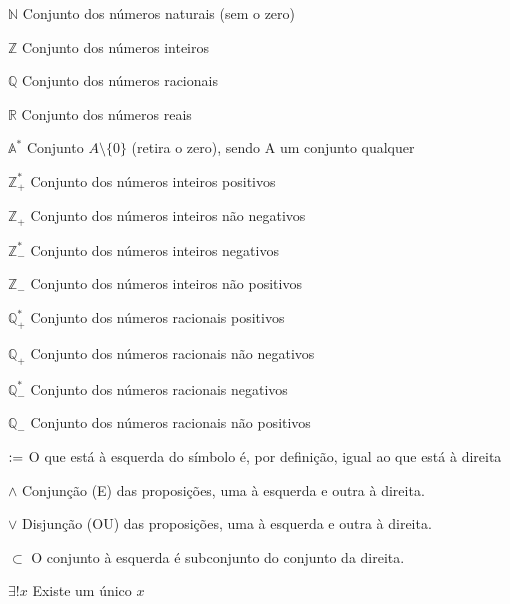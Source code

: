 \documentclass[../main.tex]{subfiles}
\begin{document}


\renewcommand\listadesimbolosname{{\fontsize{12pt}{\baselineskip}\normalfont \bfseries LISTA DE SÍMBOLOS}}
\begin{simbolos}
  \item[$ \mathbb{N} $] Conjunto dos números naturais (sem o zero)
  \item[$ \mathbb{Z} $] Conjunto dos números inteiros 
  \item[$ \mathbb{Q} $] Conjunto dos números racionais 
  \item[$ \mathbb{R} $] Conjunto dos números reais
  \item[$\mathbb{A^*}$] Conjunto $A \setminus \{0\}$ (retira o zero), sendo A um conjunto qualquer
  \item[$ \mathbb{Z}_+^{*} $] Conjunto dos números inteiros positivos
  \item[$ \mathbb{Z}_+$] Conjunto dos números inteiros não negativos
  \item[$ \mathbb{Z}_-^{*} $] Conjunto dos números inteiros negativos
  \item[$ \mathbb{Z}_-$] Conjunto dos números inteiros não positivos
  \item[$ \mathbb{Q}_+^{*} $] Conjunto dos números racionais positivos
  \item[$ \mathbb{Q}_+$] Conjunto dos números racionais não negativos
  \item[$ \mathbb{Q}_-^{*} $] Conjunto dos números racionais negativos
  \item[$ \mathbb{Q}_-$] Conjunto dos números racionais não positivos
  \item[$\vcentcolon=$] O que está à esquerda do símbolo é, por definição, igual ao que está à direita
  \item[$\land$] Conjunção (E) das proposições, uma à esquerda e outra à direita. 
  \item[$\lor$] Disjunção (OU) das proposições, uma à esquerda e outra à direita. 
  \item[$\subset$] O conjunto à esquerda é subconjunto do conjunto da direita. 
  \item[$\exists!x$] Existe um único $x$
\end{simbolos}



\renewcommand\contentsname{{\fontsize{12pt}{\baselineskip}\normalfont \bfseries SUMÁRIO}}
\pdfbookmark[0]{\contentsname}{toc}
\tableofcontents*
\cleardoublepage
\end{document}
